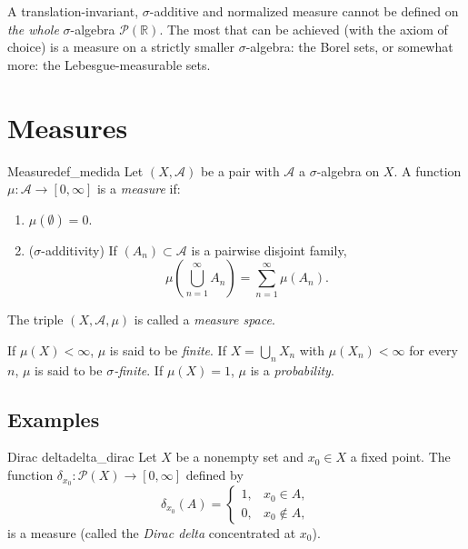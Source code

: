 \documentclass[11pt, a4paper]{article}
\begin{document}
\obs A translation-invariant, $\sigma$-additive and
normalized measure cannot be defined on \emph{the whole} $\sigma$-algebra $\mathcal{P}(\mathbb{R})$. The most that
can be achieved (with the axiom of choice) is a measure on a strictly
smaller $\sigma$-algebra: the Borel sets, or somewhat more: the Lebesgue-measurable sets.

\newpage

\section{Measures}

\begin{definicion}{Measure}{def_medida}
Let $(X, \mathcal{A})$ be a pair with $\mathcal{A}$ a $\sigma$-algebra on $X$. A function
$\mu: \mathcal{A} \to [0, \infty]$ is a \emph{measure} if:
\begin{enumerate}
    \item $\mu(\emptyset) = 0$.
    \item ($\sigma$-additivity) If $(A_n) \subset \mathcal{A}$ is a pairwise disjoint family,
    $$ \mu\!\left(\bigcup_{n=1}^\infty A_n\right) = \sum_{n=1}^\infty \mu(A_n). $$
\end{enumerate}
The triple $(X, \mathcal{A}, \mu)$ is called a \emph{measure space}.

If $\mu(X) < \infty$, $\mu$ is said to be \emph{finite}. If $X = \bigcup_n X_n$ with
$\mu(X_n) < \infty$ for every $n$, $\mu$ is said to be \emph{$\sigma$-finite}. If $\mu(X) = 1$,
$\mu$ is a \emph{probability}.
\end{definicion}

\subsection{Examples}

\begin{proposicion}{Dirac delta}{delta_dirac}
Let $X$ be a nonempty set and $x_0 \in X$ a fixed point. The function $\delta_{x_0}:
\mathcal{P}(X) \to [0, \infty]$ defined by
$$ \delta_{x_0}(A) = \begin{cases} 1, & x_0 \in A, \\ 0, & x_0 \notin A, \end{cases} $$
is a measure (called the \emph{Dirac delta} concentrated at $x_0$).
\end{proposicion}
\end{document}
